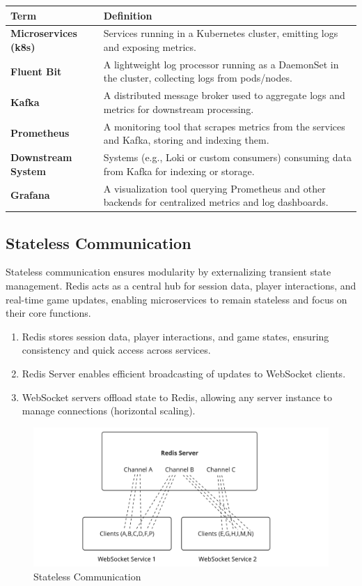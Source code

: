 \begin{longtable}{|l|p{7.5cm}|}
\hline
\textbf{Term} & \textbf{Definition} \\ \hline
\endfirsthead
\textbf{Microservices (k8s)} & Services running in a Kubernetes cluster, emitting logs and exposing metrics. \\ \hline
\textbf{Fluent Bit} & A lightweight log processor running as a DaemonSet in the cluster, collecting logs from pods/nodes. \\ \hline
\textbf{Kafka} & A distributed message broker used to aggregate logs and metrics for downstream processing. \\ \hline
\textbf{Prometheus} & A monitoring tool that scrapes metrics from the services and Kafka, storing and indexing them. \\ \hline
\textbf{Downstream System} & Systems (e.g., Loki or custom consumers) consuming data from Kafka for indexing or storage. \\ \hline
\textbf{Grafana} & A visualization tool querying Prometheus and other backends for centralized metrics and log dashboards. \\ \hline
\end{longtable}

\subsection{Stateless Communication}

Stateless communication ensures modularity by externalizing transient state management. Redis acts as a central hub for session data, player interactions, and real-time game updates, enabling microservices to remain stateless and focus on their core functions.

\begin{enumerate}
    \item Redis stores session data, player interactions, and game states, ensuring consistency and quick access across services.
    \item Redis Server enables efficient broadcasting of updates to WebSocket clients.
    \item WebSocket servers offload state to Redis, allowing any server instance to manage connections (horizontal scaling).
\end{enumerate}

\begin{figure}[h!]
    \centering
    \includegraphics[width=1\textwidth]{Stateless.jpg}
    \caption{Stateless Communication}
    \label{fig:auth-diagram}
\end{figure}

